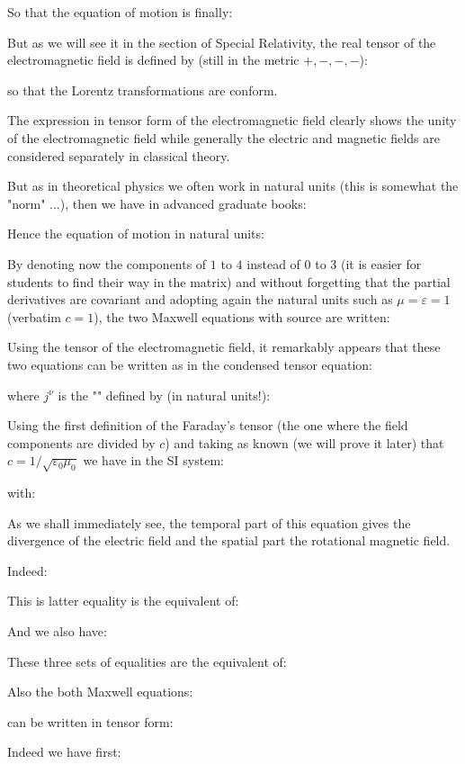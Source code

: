 	So that the equation of motion is finally:
	
	But as we will see it in the section of Special Relativity, the real tensor of the electromagnetic field is defined by (still in the metric $+, -, -, -$):	
	
	so that the Lorentz transformations are conform.

	The expression in tensor form of the electromagnetic field clearly shows the unity of the electromagnetic field while generally the electric and magnetic fields are considered separately in classical theory.

	But as in theoretical physics we often work in natural units (this is somewhat the "norm" ...), then we have in advanced graduate books:
	
	Hence the equation of motion in natural units:
	
	By denoting now the components of $1$ to $4$ instead of $0$ to $3$ (it is easier for students to find their way in the matrix) and without forgetting that the partial derivatives are covariant and adopting again the natural units such as $\mu=\varepsilon=1$ (verbatim $c=1$), the two Maxwell equations with source are written:
	
	Using the tensor of the electromagnetic field, it remarkably appears that these two equations can be written as in the condensed tensor equation:
	
	where $j^\nu$ is the "\label{four vector current}" defined by (in natural units!):
	
	Using the first definition of the Faraday's tensor (the one where the field components are divided by $c$) and taking as known (we will prove it later) that $c=1/\sqrt{\varepsilon_0\mu_0}$ we have in the SI system:
	
	with:
	
	As we shall immediately see, the temporal part of this equation gives the divergence of the electric field and the spatial part the rotational magnetic field.
	
	Indeed:
	
	This is latter equality is the equivalent of:
	
	And we also have:
	
	These three sets of equalities are the equivalent of:
	
	Also the both Maxwell equations:
	
	can be written in tensor form:
	
	Indeed we have first:
	

